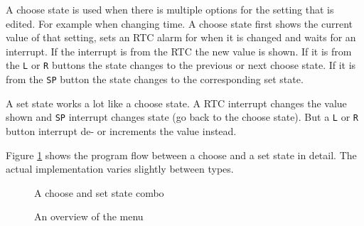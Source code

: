 \documentclass{awac02}
\begin{document}
A choose state is used when there is multiple options for the setting that is
edited. For example when changing time. A choose state first shows the current
value of that setting, sets an RTC alarm for when it is changed and waits for
an interrupt. If the interrupt is from the RTC the new value is shown. If it is
from the \texttt{L} or \texttt{R} buttons the state changes to the previous or
next choose state. If it is from the \texttt{SP} button the state changes to
the corresponding set state.

A set state works a lot like a choose state. A RTC interrupt changes the value
shown and \texttt{SP} interrupt changes state (go back to the choose state).
But a \texttt{L} or \texttt{R} button interrupt de- or increments the value
instead.

Figure \ref{fig:choose-and-set-state} shows the program flow between a choose
and a set state in detail. The actual implementation varies slightly
between types.

\begin{figure}[h]
    \centering
    
    \caption{A choose and set state combo}
    \label{fig:choose-and-set-state}
\end{figure}

\begin{figure}[h]
    \centering
    
    \label{fig:menu-flowchart}
    \caption{An overview of the menu}
\end{figure}
\end{document}
